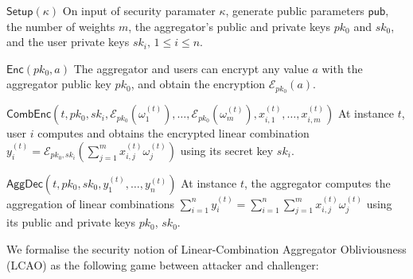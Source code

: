 \documentclass[10pt,journal,compsoc]{IEEEtran}
\theoremstyle{definition}
\theoremstyle{definition}
\theoremstyle{remark}
\begin{document}
\begin{LaTeXdescription}
    \item[$\mathsf{Setup}(\kappa)$] On input of security paramater $\kappa$, generate public parameters $\mathsf{pub}$, the number of weights $m$, the aggregator's public and private keys $pk_0$ and $sk_0$, and the user private keys $sk_i,\,1\leq i \leq n$.
    \item[$\mathsf{Enc}(pk_0, a)$] The aggregator and users can encrypt any value $a$ with the aggregator public key $pk_0$, and obtain the encryption $\mathcal{E}_{pk_0}(a)$.
    \item[$\mathsf{CombEnc}(t, pk_0, sk_i, \mathcal{E}_{pk_0}(\omega_1^{(t)}),\dots,\mathcal{E}_{pk_0}(\omega_m^{(t)}), x^{(t)}_{i,1},\dots,x^{(t)}_{i,m})$] At instance $t$, user $i$ computes and obtains the encrypted linear combination $y^{(t)}_i = \mathcal{E}_{pk_0,sk_i}(\sum^m_{j=1}x^{(t)}_{i,j}\omega^{(t)}_j)$ using its secret key $sk_i$.
    \item[$\mathsf{AggDec}(t, pk_0, sk_0, y^{(t)}_1,\dots,y^{(t)}_n)$] At instance $t$, the aggregator computes the aggregation of linear combinations $\sum^{n}_{i=1}y_i^{(t)}=\sum^{n}_{i=1}\sum^{m}_{j=1} x^{(t)}_{i,j}\omega^{(t)}_j$ using its public and private keys $pk_0$, $sk_0$.
\end{LaTeXdescription}

We formalise the security notion of Linear-Combination Aggregator Obliviousness (LCAO) as the following game between attacker and challenger:
\end{document}
